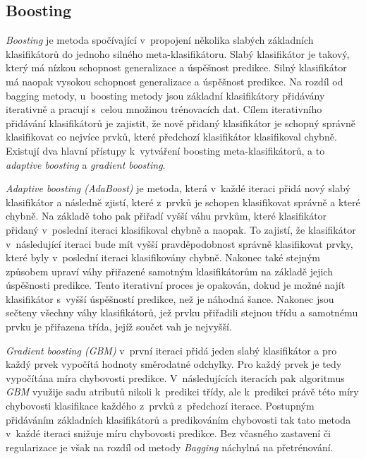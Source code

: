 \subsection*{Boosting}
\label{boosting}
\textit{Boosting} je metoda spočívající v~propojení několika slabých základních klasifikátorů do jednoho silného meta-klasifikátoru. Slabý klasifikátor je takový, který má nízkou schopnost generalizace a úspěšnost predikce. Silný klasifikátor má naopak vysokou schopnost generalizace a úspěšnost predikce. Na rozdíl od bagging metody, u~boosting metody jsou základní klasifikátory přidávány iterativně a pracují s~celou množinou trénovacích dat. Cílem iterativního přidávání klasifikátorů je zajistit, že nově přidaný klasifikátor je schopný správně klasifikovat co nejvíce prvků, které předchozí klasifikátor klasifikoval chybně. Existují dva hlavní přístupy k~vytváření boosting meta-klasifikátorů, a to \textit{adaptive boosting} a \textit{gradient boosting}.

\textit{Adaptive boosting (AdaBoost)} je metoda, která v~každé iteraci přidá nový slabý klasifikátor a následně zjistí, které z~prvků je schopen klasifikovat správně a které chybně. Na základě toho pak přiřadí vyšší váhu prvkům, které klasifikátor přidaný v~poslední iteraci klasifikoval chybně a naopak. To zajistí, že klasifikátor v~následující iteraci bude mít vyšší pravděpodobnost správně klasifikovat prvky, které byly v~poslední iteraci klasifikovány chybně. Nakonec také stejným způsobem upraví váhy přiřazené samotným klasifikátorům na základě jejich úspěšnosti predikce. Tento iterativní proces je opakován, dokud je možné najít klasifikátor s~vyšší úspěšností predikce, než je náhodná šance. Nakonec jsou sečteny všechny váhy klasifikátorů, jež prvku přiřadili stejnou třídu a samotnému prvku je přiřazena třída, jejíž součet vah je nejvyšší.

\textit{Gradient boosting (GBM)} v~první iteraci přidá jeden slabý klasifikátor a pro každý prvek vypočítá hodnoty směrodatné odchylky. Pro každý prvek je tedy vypočítána míra chybovosti predikce. V~následujících iteracích pak algoritmus \textit{GBM} využije sadu atributů nikoli k~predikci třídy, ale k~predikci právě této míry chybovosti klasifikace každého z~prvků z~předchozí iterace. Postupným přidáváním základních klasifikátorů a predikováním chybovosti tak tato metoda v~každé iteraci snižuje míru chybovosti predikce. Bez včasného zastavení či regularizace je však na rozdíl od metody \textit{Bagging} náchylná na přetrénování.

